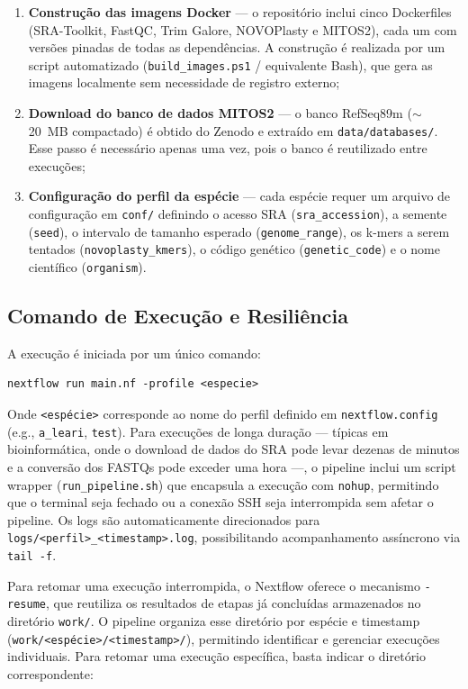\begin{enumerate}
    \item \textbf{Construção das imagens Docker} --- o repositório inclui cinco Dockerfiles (SRA-Toolkit, FastQC, Trim Galore, NOVOPlasty e MITOS2), cada um com versões pinadas de todas as dependências. A construção é realizada por um script automatizado (\texttt{build\_images.ps1} / equivalente Bash), que gera as imagens localmente sem necessidade de registro externo;
    \item \textbf{Download do banco de dados MITOS2} --- o banco RefSeq89m ($\sim$20~MB compactado) é obtido do Zenodo e extraído em \texttt{data/databases/}. Esse passo é necessário apenas uma vez, pois o banco é reutilizado entre execuções;
    \item \textbf{Configuração do perfil da espécie} --- cada espécie requer um arquivo de configuração em \texttt{conf/} definindo o acesso SRA (\texttt{sra\_accession}), a semente (\texttt{seed}), o intervalo de tamanho esperado (\texttt{genome\_range}), os k-mers a serem tentados (\texttt{novoplasty\_\allowbreak kmers}), o código genético (\texttt{genetic\_code}) e o nome científico (\texttt{organism}).
\end{enumerate}

\subsection{Comando de Execução e Resiliência}

A execução é iniciada por um único comando:

\begin{lstlisting}
nextflow run main.nf -profile <especie>
\end{lstlisting}

Onde \texttt{<espécie>} corresponde ao nome do perfil definido em \texttt{nextflow.config} (e.g., \texttt{a\_leari}, \texttt{test}). Para execuções de longa duração --- típicas em bioinformática, onde o download de dados do SRA pode levar dezenas de minutos e a conversão dos FASTQs pode exceder uma hora ---, o pipeline inclui um script wrapper (\texttt{run\_pipeline.sh}) que encapsula a execução com \texttt{nohup}, permitindo que o terminal seja fechado ou a conexão SSH seja interrompida sem afetar o pipeline. Os logs são automaticamente direcionados para \texttt{logs/<perfil>\_<timestamp>.log}, possibilitando acompanhamento assíncrono via \texttt{tail~-f}.

Para retomar uma execução interrompida, o Nextflow oferece o mecanismo \texttt{-resume}, que reutiliza os resultados de etapas já concluídas armazenados no diretório \texttt{work/}. O pipeline organiza esse diretório por espécie e timestamp (\texttt{work/<espécie>/\allowbreak<timestamp>/}), permitindo identificar e gerenciar execuções individuais. Para retomar uma execução específica, basta indicar o diretório correspondente:

